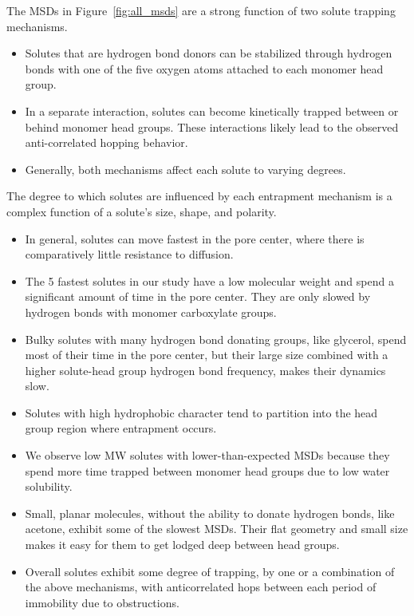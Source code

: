 \documentclass{article}
\begin{document}
  \noindent The MSDs in Figure~\ref{fig:all_msds} are a strong function of two solute 
  trapping mechanisms. %
  \begin{itemize}
  	\item Solutes that are hydrogen bond donors can be stabilized through hydrogen bonds
  	with one of the five oxygen atoms attached to each monomer head group. 
  	\item In a separate interaction, solutes can become kinetically trapped between or behind
  	monomer head groups. These interactions likely lead to the observed anti-correlated
  	hopping	behavior.
  	\item Generally, both mechanisms affect each solute to varying degrees.
  \end{itemize}
  
  
  \noindent The degree to which solutes are influenced by each entrapment mechanism
  is a complex function of a solute's size, shape, and polarity.
  \begin{itemize}
    \item In general, solutes can move fastest in the pore center, where
    there is comparatively little resistance to diffusion.
	\item The 5 fastest solutes in our study have a low molecular weight and
	spend a significant amount of time in the pore center. They are only slowed
	by hydrogen bonds with monomer carboxylate groups.
	\item Bulky solutes with many hydrogen bond donating groups, like glycerol,
	spend most of their time in the pore center, but their large size combined
	with a higher solute-head group hydrogen bond frequency, makes their dynamics slow. 
    \item Solutes with high hydrophobic character tend to partition into the 
    head group region where entrapment occurs.
    \item We observe low MW solutes with lower-than-expected MSDs because they
    spend more time trapped between monomer head groups due to low water
    solubility.
    \item Small, planar molecules, without the ability to donate hydrogen bonds, like acetone,
    exhibit some of the slowest MSDs. Their flat geometry and small size makes it easy for 
    them to get lodged deep between head groups.
  	\item Overall solutes exhibit some degree of trapping, by one or a combination of the above
  	mechanisms, with anticorrelated hops between each period of immobility due to 
  	obstructions.
  \end{itemize}
  
\end{document}
